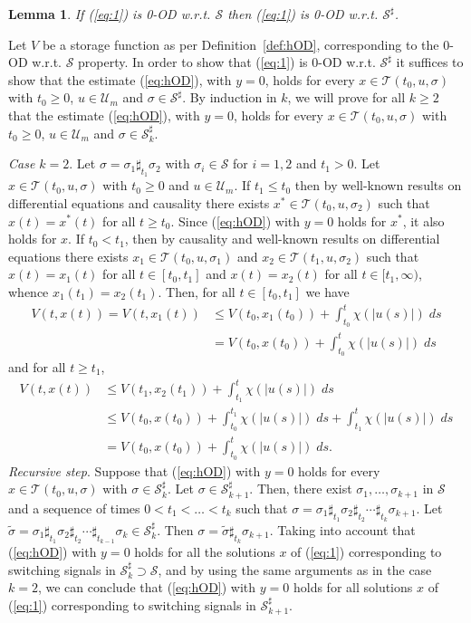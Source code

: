 \documentclass[9pt,final,journal]{IEEEtran}
\newtheorem{lema}{Lemma}
\def\S{\mathcal{S}}
\def\T{\mathcal{T}}
\def\U{\mathcal{U}}
\begin{document}
\begin{lema} 
  \label{lem:concatenation} 
  If (\ref{eq:1}) is 0-OD w.r.t. $\S$ then (\ref{eq:1}) is 0-OD w.r.t. $\S^{\sharp}$.
\end{lema}
\begin{IEEEproof}
  Let $V$ be a storage function as per Definition~\ref{def:hOD}, corresponding to the 0-OD w.r.t. $\S$ property. In order to show that (\ref{eq:1}) is 0-OD w.r.t. $\S^{\sharp}$ it suffices to show that the estimate (\ref{eq:hOD}), with $y=0$, holds for every $x\in \T(t_0,u,\sigma)$ with $t_0\ge 0$, $u\in \U_m$ and $\sigma\in \S^{\sharp}$. By induction in $k$, we will prove for all $k\ge 2$ that the estimate (\ref{eq:hOD}), with $y=0$, holds for every $x\in \T(t_0,u,\sigma)$ with $t_0\ge 0$, $u\in \U_m$ and $\sigma\in \S^{\sharp}_k$.

  {\em Case $k=2$}. Let $\sigma=\sigma_1\sharp_{t_1}\sigma_2$ with $\sigma_i\in \S$ for $i=1,2$ and $t_1>0$. Let $x \in \T(t_0,u,\sigma)$ with $t_0\ge 0$ and $u\in \U_m$. If   $t_1\le t_0$ then by well-known results on differential equations and causality there exists $x^*\in \T(t_0,u,\sigma_2)$ such that $x(t)=x^*(t)$ for all $t\ge t_0$. Since (\ref{eq:hOD}) with $y=0$ holds for $x^*$, it also holds for $x$. If $t_0<t_1$, then by causality and well-known results on differential equations there exists $x_1\in \T(t_0,u,\sigma_1)$ and $x_2\in \T(t_1,u,\sigma_2)$ such that $x(t)=x_1(t)$ for all $t\in [t_0,t_1]$ and $x(t)=x_2(t)$ for all $t\in [t_1,\infty)$, whence $x_1(t_1)=x_2(t_1)$. Then, for all $t\in [t_0,t_1]$ we have
  \begin{align*}
    V(t,x(t))=V(t,x_1(t))&\le V(t_0,x_1(t_0))+\int_{t_0}^{t}\chi(|u(s)|)\;ds \\
                         &= V(t_0,x(t_0))+\int_{t_0}^{t}\chi(|u(s)|)\;ds 
  \end{align*}
  and for all $t\ge t_1$,
  \begin{align*}
    V(t,x(t))&\le V(t_1,x_2(t_1))+\int_{t_1}^{t}\chi(|u(s)|)\;ds \\
             &\le V(t_0,x(t_0))+\int_{t_0}^{t_1}\chi(|u(s)|)\;ds + \int_{t_1}^{t}\chi(|u(s)|)\;ds \\
             &= V(t_0,x(t_0))+\int_{t_0}^{t}\chi(|u(s)|)\;ds.
  \end{align*}
  {\em Recursive step}. Suppose that (\ref{eq:hOD}) with $y=0$ holds for every $x\in \T(t_0,u,\sigma)$ with $\sigma \in \S^{\sharp}_k$. Let $\sigma\in \S^{\sharp}_{k+1}$. Then, there exist $\sigma_1,\ldots,\sigma_{k+1}$ in $\S$ and a sequence of times $0< t_1<\ldots<t_{k}$ such that $\sigma=\sigma_1\sharp_{t_1}\sigma_2\sharp_{t_2}\cdots    \sharp_{t_{k}}\sigma_{k+1}$. Let $\tilde\sigma=\sigma_1\sharp_{t_1}\sigma_2\sharp_{t_2}\cdots
  \sharp_{t_{k-1}}\sigma_k \in \S^{\sharp}_k$. Then $\sigma=\tilde \sigma \sharp_{t_{k}}\sigma_{k+1}$. Taking into account that (\ref{eq:hOD}) with $y=0$ holds for all the solutions $x$ of (\ref{eq:1}) corresponding to switching signals in $\S^{\sharp}_k\supset\S$, and by using the same arguments as in the case $k=2$, we can conclude that (\ref{eq:hOD}) with $y=0$ holds for all solutions $x$ of (\ref{eq:1}) corresponding to switching signals in $\S^{\sharp}_{k+1}$.
\end{IEEEproof}
\end{document}
